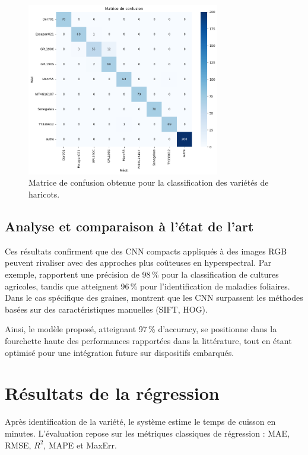 \begin{figure}[H]
	\centering
	\includegraphics[width=0.75\textwidth]{figures/matrice_confusion.png}
	\caption{Matrice de confusion obtenue pour la classification des variétés de haricots.}
	\label{fig:matrice_confusion}
\end{figure}

\subsection{Analyse et comparaison à l’état de l’art}

Ces résultats confirment que des CNN compacts appliqués à des images RGB peuvent rivaliser avec des approches plus coûteuses en hyperspectral.
Par exemple, \cite{mohanty2016using} rapportent une précision de 98\,\% pour la classification de cultures agricoles, tandis que \cite{sladojevic2016deep} atteignent 96\,\% pour l’identification de maladies foliaires.
Dans le cas spécifique des graines, \cite{jiang2020cnn} montrent que les CNN surpassent les méthodes basées sur des caractéristiques manuelles (SIFT, HOG).

Ainsi, le modèle proposé, atteignant 97\,\% d’accuracy, se positionne dans la fourchette haute des performances rapportées dans la littérature, tout en étant optimisé pour une intégration future sur dispositifs embarqués.

\section{Résultats de la régression}
\label{sec:resultats_regression}

Après identification de la variété, le système estime le temps de cuisson en minutes.
L’évaluation repose sur les métriques classiques de régression : MAE, RMSE, $R^2$, MAPE et MaxErr.


